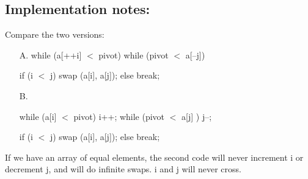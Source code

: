 \documentclass[10pt,a4paper]{article}
\begin{document}
	\subsection{Implementation notes:}
	Compare the two versions:
	\begin{enumerate}
		
		\item[A.] 
		while (a[++i] $<$ pivot) {}
		while (pivot $<$ a[--j]) {}
		
		if (i $<$ j) swap (a[i], a[j]);
		else break;
		\item[B.] \
		
		while (a[i] $<$ pivot) {i++;}
		while (pivot $<$ a[j] ) {j--;}
		
		if (i $<$ j) swap (a[i], a[j]);
		else break;
	\end{enumerate}
	If we have an array of equal elements, the second code will never increment i or decrement j, 
	and will do infinite swaps. i and j will never cross.
	
	
\end{document}
